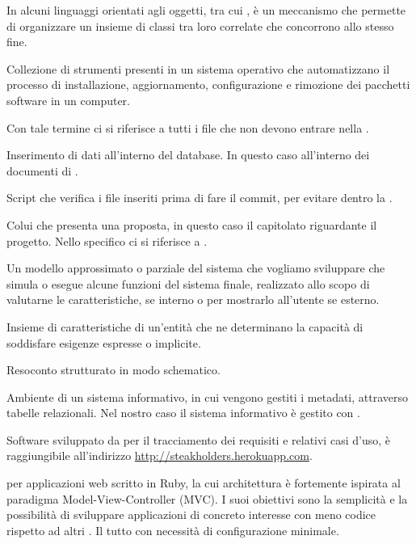In alcuni linguaggi orientati agli oggetti, tra cui , è un meccanismo che permette di organizzare un insieme di classi tra loro correlate che concorrono allo stesso fine.

Collezione di strumenti presenti in un sistema operativo che automatizzano il processo di installazione, aggiornamento, configurazione e rimozione dei pacchetti software in un computer.

Con tale termine ci si riferisce a tutti i file che non devono entrare nella .

Inserimento di dati all'interno del database. In questo caso all'interno dei documenti di .

Script che verifica i file inseriti prima di fare il commit, per evitare  dentro la .

Colui che presenta una proposta, in questo caso il capitolato riguardante il progetto.
Nello specifico ci si riferisce a \Proponente{}.

Un modello approssimato o parziale del sistema che vogliamo sviluppare che simula o esegue alcune funzioni del sistema finale, realizzato allo scopo di valutarne le caratteristiche, se interno o per mostrarlo all'utente se esterno.


Insieme di caratteristiche di un'entità che ne determinano la capacità di soddisfare esigenze espresse o implicite.


Resoconto strutturato in modo schematico.

Ambiente di un sistema informativo, in cui vengono gestiti i metadati, attraverso tabelle relazionali.
Nel nostro caso il sistema informativo è gestito con .

Software sviluppato da \GroupName{} per il tracciamento dei requisiti e relativi casi d'uso, è raggiungibile all'indirizzo \url{http://steakholders.herokuapp.com}.

  per applicazioni web scritto in Ruby, la cui architettura è fortemente ispirata al paradigma Model-View-Controller (MVC). I suoi obiettivi sono la semplicità e la possibilità di sviluppare applicazioni di concreto interesse con meno codice rispetto ad altri . Il tutto con necessità di configurazione minimale.


